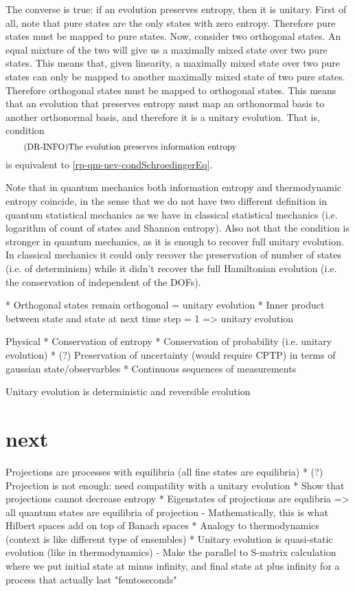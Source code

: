 The converse is true: if an evolution preserves entropy, then it is unitary. First of all, note that pure states are the only states with zero entropy. Therefore pure states must be mapped to pure states. Now, consider two orthogonal states. An equal mixture of the two will give us a maximally mixed state over two pure states. This means that, given linearity, a maximally mixed state over two pure states can only be mapped to another maximally mixed state of two pure states. Therefore orthogonal states must be mapped to orthogonal states. This means that an evolution that preserves entropy must map an orthonormal basis to another orthonormal basis, and therefore it is a unitary evolution. That is, condition
\begin{equation}\label{rp-qm-uev-condInfoEntropy}
	\tag{DR-INFO}
	\eqtext{The evolution preserves information entropy} 
\end{equation}
is equivalent to \ref{rp-qm-uev-condSchroedingerEq}.

Note that in quantum mechanics both information entropy and thermodynamic entropy coincide, in the sense that we do not have two different definition in quantum statistical mechanics as we have in classical statistical mechanics (i.e. logarithm of count of states and Shannon entropy). Also not that the condition is stronger in quantum mechanics, as it is enough to recover full unitary evolution. In classical mechanics it could only recover the preservation of number of states (i.e. of determinism) while it didn't recover the full Hamiltonian evolution (i.e. the conservation of independent of the DOFs).

* Orthogonal states remain orthogonal = unitary evolution
* Inner product between state and state at next time step = 1 => unitary evolution

Physical
* Conservation of entropy
* Conservation of probability (i.e. unitary evolution)
* (?) Preservation of uncertainty (would require CPTP) in terms of gaussian state/observarbles
* Continuous sequences of measurements 

Unitary evolution is deterministic and reversible evolution

\section{next}

Projections are processes with equilibria (all fine states are equilibria)
* (?) Projection is not enough: need compatility with a unitary evolution
* Show that projections cannot decrease entropy
* Eigenstates of projections are equlibria => all quantum states are equilibria of projection
  - Mathematically, this is what Hilbert spaces add on top of Banach spaces
* Analogy to thermodynamics (context is like different type of ensembles)
* Unitary evolution is quasi-static evolution (like in thermodynamics)
  - Make the parallel to S-matrix calculation where we put initial state at minus infinity, and final state at plus infinity for a process that actually last "femtoseconds"

